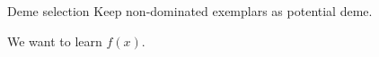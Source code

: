 \documentclass{beamer}
\begin{document}
\frame
{ 
  \begin{beamerboxesrounded}{Deme selection}
    Keep non-dominated exemplars as potential deme.
  \end{beamerboxesrounded}

  \pause
  We want to \alert{learn $f(x)$}.


}
\end{document}
